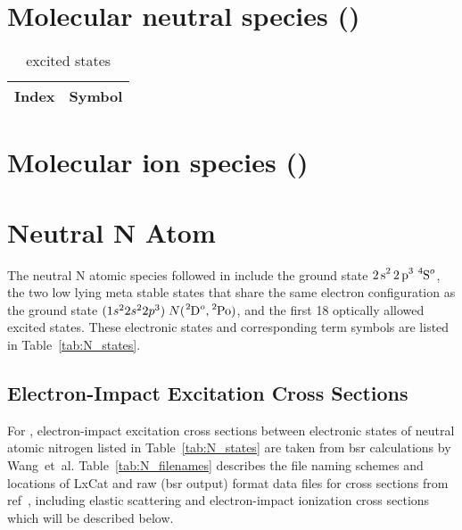 \section{Molecular neutral species ()}

\begin{table}
		\caption{ excited states}
		\begin{tabular}{c c}
				\hline\hline
				Index & Symbol \\
				
				\hline\hline
		\end{tabular}
\end{table}




\section{Molecular ion species ()}
\tbd


\section{Neutral N Atom}

The neutral N atomic species followed in \bpcmn{} include
the ground state $\ce{2s^2 2p^3}\;\ce{^4S^o}$, the two low lying meta stable states
that share the same electron configuration as the ground state
$(1s^22s^22p^3)\; N(\ce{^2D^o}, \ce{^2Po})$, and the first 18 optically allowed 
excited states.  These electronic states and corresponding term symbols
are listed in Table~\ref{tab:N_states}. 

\subsection{Electron-Impact Excitation Cross Sections}

For \bpcmn{}, electron-impact excitation
cross sections between electronic 
states of neutral
atomic nitrogen listed in Table~\ref{tab:N_states} are taken from \ac{bsr}
calculations by Wang~et~al.\cite{wang2014} 
Table~\ref{tab:N_filenames} describes the file naming schemes and locations of LxCat and raw (\ac{bsr} output)
format data files for cross sections from ref~\cite{wang2014}, including elastic scattering and electron-impact 
ionization cross sections which will be described below. \\

